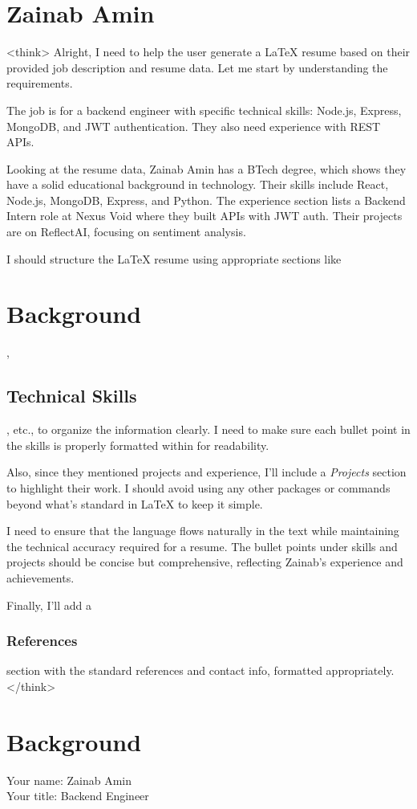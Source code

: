 \documentclass{article}
\begin{document}
\section*{Zainab Amin}
<think>
Alright, I need to help the user generate a LaTeX resume based on their provided job description and resume data. Let me start by understanding the requirements.

The job is for a backend engineer with specific technical skills: Node.js, Express, MongoDB, and JWT authentication. They also need experience with REST APIs. 

Looking at the resume data, Zainab Amin has a BTech degree, which shows they have a solid educational background in technology. Their skills include React, Node.js, MongoDB, Express, and Python. The experience section lists a Backend Intern role at Nexus Void where they built APIs with JWT auth. Their projects are on ReflectAI, focusing on sentiment analysis.

I should structure the LaTeX resume using appropriate sections like \section{Background}, \subsection{Technical Skills}, etc., to organize the information clearly. I need to make sure each bullet point in the skills is properly formatted within \itemize for readability.

Also, since they mentioned projects and experience, I'll include a \textit{Projects} section to highlight their work. I should avoid using any other packages or commands beyond what's standard in LaTeX to keep it simple.

I need to ensure that the language flows naturally in the text while maintaining the technical accuracy required for a resume. The bullet points under skills and projects should be concise but comprehensive, reflecting Zainab's experience and achievements.

Finally, I'll add a \subsubsection{References} section with the standard references and contact info, formatted appropriately.
</think>

\section{Background}
Your name: Zainab Amin \\
Your title: Backend Engineer \\
\end{document}
